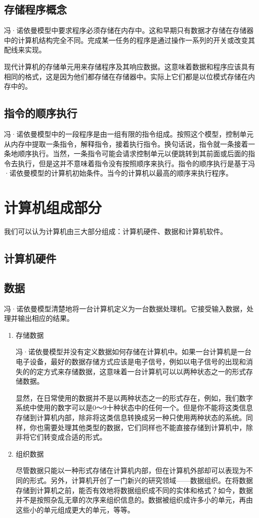 \subsection{存储程序概念}

冯·诺依曼模型中要求程序必须存储在内存中。这和早期只有数据才存储在存储器中的计算机结构完全不同。完成某一任务的程序是通过操作一系列的开关或改变其配线来实现。

现代计算机的存储单元用来存储程序及其响应数据。这意味着数据和程序应该具有相同的格式，这是因为他们都存储在存储器中。实际上它们都是以位模式存储在内存中的。

\subsection{指令的顺序执行}

冯·诺依曼模型中的一段程序是由一组有限的指令组成。按照这个模型，控制单元从内存中提取一条指令，解释指令，接着执行指令。换句话说，指令就一条接着一条地顺序执行。当然，一条指令可能会请求控制单元以便跳转到其前面或后面的指令去执行，但是这并不意味着指令没有按照顺序来执行。指令的顺序执行是基于冯·诺依曼模型的计算机初始条件。当今的计算机以最高的顺序来执行程序。

\section{计算机组成部分}

我们可以认为计算机由三大部分组成：计算机硬件、数据和计算机软件。

\subsection{计算机硬件}
\subsection{数据}

冯·诺依曼模型清楚地将一台计算机定义为一台数据处理机。它接受输入数据，处理并输出相应的结果。

\begin{enumerate}
	\item 存储数据

	冯·诺依曼模型并没有定义数据如何存储在计算机中。如果一台计算机是一台电子设备，最好的数据存储方式应该是电子信号，例如以电子信号的出现和消失的的定方式来存储数据，这意味着一台计算机可以以两种状态之一的形式存储数据。

	显然，在日常使用的数据并不是以两种状态之一的形式存在，例如，我们数字系统中使用的数字可以是0～9十种状态中的任何一个。但是你不能将这类信息存储到计算机内部，除非将这类信息转换成另一种只使用两种状态的系统。同样，你也需要处理其他类型的数据，它们同样也不能直接存储到计算机中，除非将它们转变成合适的形式。
	\item 组织数据

	尽管数据只能以一种形式存储在计算机内部，但在计算机外部却可以表现为不同的形式。另外，计算机开创了一门新兴的研究领域——数据组织。在将数据存储到计算机之前，能否有效地将数据组织成不同的实体和格式？如今，数据并不是按照杂乱无章的次序来组织信息的。数据被组织成许多小的单元，再由这些小的单元组成更大的单元，等等。
\end{enumerate}

